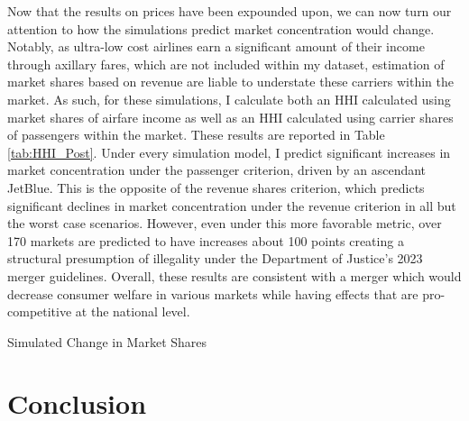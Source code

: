 \documentclass{article}
\begin{document}
    Now that the results on prices have been expounded upon, we can now turn our attention to how the simulations predict market concentration would change. Notably, as ultra-low cost airlines earn a significant amount of their income through axillary fares, which are not included within my dataset, estimation of market shares based on revenue are liable to understate these carriers within the market. As such, for these simulations, I calculate both an HHI calculated using market shares of airfare income as well as an HHI calculated using carrier shares of passengers within the market. These results are reported in Table  \ref{tab:HHI_Post}. Under every simulation model, I predict significant increases in market concentration under the passenger criterion, driven by an ascendant JetBlue. This is the opposite of the revenue shares criterion, which predicts significant declines in market concentration under the revenue criterion in all but the worst case scenarios. However, even under this more favorable metric, over 170 markets are predicted to have increases about 100 points creating a structural presumption of illegality under the Department of Justice's 2023 merger guidelines. Overall, these results are consistent with a merger which would decrease consumer welfare in various markets while having effects that are pro-competitive at the national level.  

      \begin{table}
        \caption{Simulated Change in Market Shares}
        \label{tab:HHI_Post}
        \vspace{-15mm}
        \begin{center}
        
        \end{center}
    \end{table}


    
	\section{Conclusion}
	\label{sec:Conclusion}
	
\end{document}
